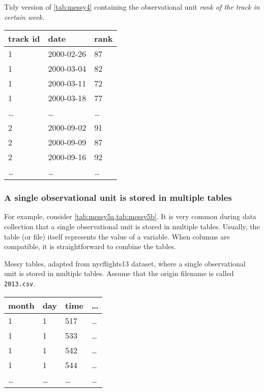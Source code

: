\begin{tablebox}[label=tab:tidy4b]{Tidy version of \cref{tab:messy4} containing the observational unit \emph{rank of the track in certain week}.}
  \centering
  \begin{tabular}{lll}
    \toprule
    \textbf{track id} & \textbf{date} & \textbf{rank} \\
    \midrule
    1 & 2000-02-26 & 87 \\
    1 & 2000-03-04 & 82 \\
    1 & 2000-03-11 & 72 \\
    1 & 2000-03-18 & 77 \\
    \dots & \dots & \dots \\
    2 & 2000-09-02 & 91 \\
    2 & 2000-09-09 & 87 \\
    2 & 2000-09-16 & 92 \\
    \dots & \dots & \dots \\
    \bottomrule
  \end{tabular}
\end{tablebox}

\subsubsection{A single observational unit is stored in multiple tables}  For example, consider
\cref{tab:messy5a,tab:messy5b}.  It is very common during data
collection that a single observational unit is stored in multiple tables.  Usually, the
table (or file) itself represents the value of a variable.  When columns are compatible,
it is straightforward to combine the tables.

\begin{tablebox}[label=tab:messy5a]{Messy tables, adapted from nycflights13 dataset, where
  a single observational unit is stored in multiple tables.  Assume that the origin
  filename is called \texttt{2013.csv}.}
  \centering
  \begin{tabular}{llll}
    \toprule
    \textbf{month} & \textbf{day} & \textbf{time} & \textbf{\dots} \\
    \midrule
    1 & 1 & 517 & \dots \\
    1 & 1 & 533 & \dots \\
    1 & 1 & 542 & \dots \\
    1 & 1 & 544 & \dots \\
    \dots & \dots & \dots & \dots \\
    \bottomrule
  \end{tabular}
\end{tablebox}

